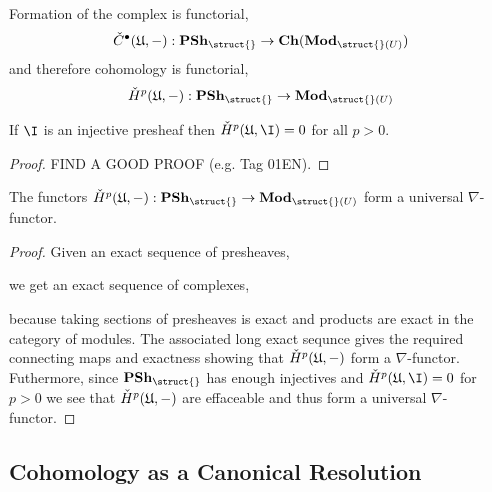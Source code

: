 \documentclass[12pt]{article}
\begin{document}
\begin{prop}
Formation of the \cech complex is functorial,
\[ \check{C}^\bullet(\fU, -) : \mathbf{PSh}_{\struct{}} \to \mathbf{Ch}(\mathbf{Mod}_{\struct{}(U)}) \]
and therefore \cech cohomology is functorial,
\[ \check{H}^p(\fU, -) : \mathbf{PSh}_{\struct{}} \to \mathbf{Mod}_{\struct{}(U)} \]
\end{prop}

\begin{lemma}
If $\I$ is an injective presheaf then $\check{H}^p(\fU, \I) = 0$ for all $p > 0$.
\end{lemma}

\begin{proof}
FIND A GOOD PROOF (e.g. Tag 01EN).
\end{proof}

\begin{prop}
The functors $\check{H}^p(\fU, -) : \mathbf{PSh}_{\struct{}} \to \mathbf{Mod}_{\struct{}(U)}$ form  a universal $\nabla$-functor.
\end{prop}

\begin{proof}
Given an exact sequence of presheaves,
\begin{center}
\end{center}
we get an exact sequence of complexes,
\begin{center}
\end{center}
because taking sections of presheaves is exact and products are exact in the category of modules. The associated long exact sequnce gives the required connecting maps and exactness showing that $\check{H}^p(\mathfrak{U}, -)$ form a $\nabla$-functor. Futhermore, since $\mathbf{PSh}_{\struct{}}$ has enough injectives and $\check{H}^p(\fU, \I) = 0$ for $p > 0$ we see that $\check{H}^p(\mathfrak{U}, -)$ are effaceable and thus form a universal $\nabla$-functor. 
\end{proof}

\subsection{\cech Cohomology as a Canonical Resolution}
\end{document}
